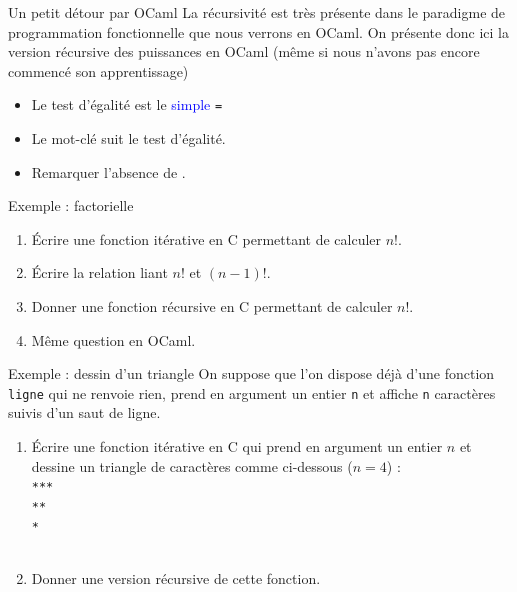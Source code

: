 \documentclass[10pt]{beamer}
\begin{document}
\begin{frame}[fragile]{\Ctitle}{\stitle}
	\begin{block}{Un petit détour par OCaml}
		La récursivité est très présente dans le paradigme de programmation fonctionnelle que nous verrons en OCaml.
		On présente donc ici la version récursive des puissances en OCaml (même si nous n'avons pas encore commencé son apprentissage)
		\begin{itemize}
			\item<2-> Le test d'égalité est le \textcolor{blue}{simple} {\tt =}
			\item<3-> Le mot-clé  suit le test d'égalité.
			\item<3-> Remarquer l'absence de .
		\end{itemize}
	\end{block}
\end{frame}


\begin{frame}[fragile]{\Ctitle}{\stitle}
	\begin{exampleblock}{Exemple : factorielle}
		\begin{enumerate}
			\item<1-> Écrire une fonction itérative en C permettant de calculer $n!$.
			\item<2-> Écrire la relation liant $n!$ et $(n-1)!$.
			\item<3-> Donner une fonction récursive en C permettant de calculer $n!$.
			\item<4-> Même question en OCaml.
		\end{enumerate}
	\end{exampleblock}
	\begin{exampleblock}{Exemple : dessin d'un triangle}
		\onslide<5->On suppose que l'on dispose déjà d'une fonction {\tt ligne} qui ne renvoie rien, prend en argument un entier {\tt n} et affiche {\tt n} caractères {\tt *} suivis d'un saut de ligne.
		\begin{enumerate}
			\item<6-> Écrire une fonction itérative en C qui prend en argument un entier $n$ et dessine un triangle de caractères
				{\tt *} comme ci-dessous ($n=4$) : \\
				{\tt ****} \\
				{\tt ***} \\
				{\tt **} \\
				{\tt *} \\
			\item<7-> Donner une version récursive de cette fonction.
		\end{enumerate}
	\end{exampleblock}
\end{frame}
\end{document}
